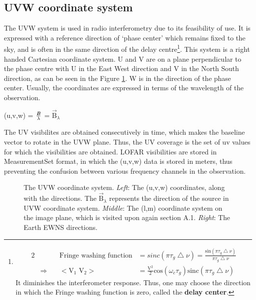 \documentclass[../main/thesis_msc.tex]{subfiles}
\begin{document}
\subsection{UVW coordinate system}
The UVW system is used in radio interferometry due to its feasibility of use. It is expressed with a reference direction of `phase center' which remains fixed to the sky, and is often in the same direction of the delay centre\footnote{
\begin{alignat}{2}
  &&\textrm{Fringe washing function} 
  &= sinc(\pi \tau_g \bigtriangleup \nu) 
  = \frac{\textrm{sin} (\pi \tau_g \bigtriangleup \nu)}{\pi \tau_g \bigtriangleup \nu}\\
  &\Rightarrow\quad
  &<\textrm{V}_1 \textrm{ V}_2 > &= \frac{\textrm{V}^2}{2}\textrm{cos}(\omega_c \tau_g) \textrm{sinc}(\pi \tau_g \bigtriangleup \nu)
\end{alignat} It diminishes the interferometer response. Thus, one may choose the direction in which the Fringe washing function is zero, called the \textbf{delay center}.}. This system is a right handed Cartesian coordinate system. U and V are on a plane perpendicular to the phase centre with U in the East West direction and V in the North South direction, as can be seen in the  Figure  \ref{UVcomp}. W is in the direction of the phase center. Usually, the coordinates are expressed in terms of the wavelength of the observation.
\begin{center}
(u,v,w) = $\frac{\textbf{\textit{B}}}{\lambda}$ = $\vec{\textrm{B}}_\lambda$
\end{center}
The UV visibilites are obtained consecutively in time, which makes the baseline vector to rotate in the UVW plane. Thus, the UV coverage is the set of uv values for which the visibilities are obtained. LOFAR visibilities are stored in MeasurementSet format, in which the (u,v,w) data is stored in meters, thus preventing the confusion between various frequency channels in the observation.
\begin{figure}[h]
    \centering
    \qquad
    \caption{The UVW coordinate system. \textit{Left}: The (u,v,w) coordinates, along with the directions. The $\vec{\textrm{B}}_\lambda$ represents the direction of the source in UVW coordinate system. \textit{Middle}: The (l,m) coordinate system on the image plane, which is visited upon again section A.1. \textit{Right}: The Earth EWNS directions.}
\label{UVcomp}
\end{figure}
\end{document}

